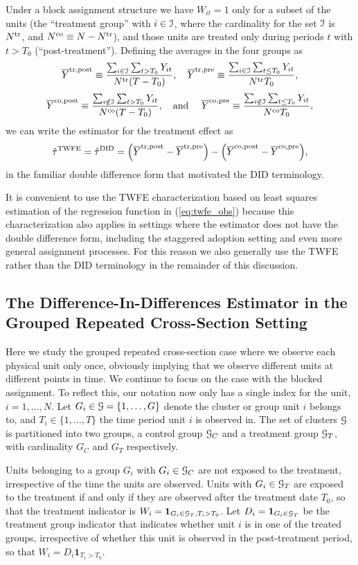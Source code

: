 \documentclass[letterpaper,12pt,leqno]{article}
\newcommand{\twfe}{\mathrm{TWFE}}
\newcommand{\treat}{{\rm tr}}
\newcommand{\control}{{\rm co}}
\newcommand{\post}{{\rm post}}
\newcommand{\pre}{{\rm pre}}
\newcommand{\oy}{\overline{Y}}
\newcommand{\did}{\mathrm{DID}}
\begin{document}
Under a block assignment structure we have  $W_{it}=1$ only for a subset of the units (the ``treatment group'' with $i\in{\cal I}$, where the cardinality for the set ${\cal I}$ is $N^\treat$, and $N^\control\equiv N-N^\treat$), and  those units are treated  only during periods $t$ with $t>T_0$ (``post-treatment'').
Defining the averages in the four groups as
\[ \oy^{\treat,\post}\equiv \frac{\sum_{i\in{\cal I}}\sum_{t>T_0} Y_{it}}{N^\treat (T-T_0)},
\quad  \oy^{\treat,\pre}\equiv \frac{\sum_{i\in{\cal I}}\sum_{t\leq T_0} Y_{it}}{N^\treat T_0},
\]
\[ \oy^{\control,\post}\equiv \frac{\sum_{i\notin{\cal I}}\sum_{t>T_0} Y_{it}}{N^\control (T-T_0)},
\quad\textrm{and } \quad \oy^{\control,\pre}\equiv \frac{\sum_{i\notin{\cal I}}\sum_{t\leq T_0} Y_{it}}{N^\control T_0},
\]
 we can write the estimator for the treatment effect as
\[ \hat\tau^\twfe= \hat\tau^\did=\Bigl(\oy^{\treat,\post}- \oy^{\treat,\pre}\Bigr)-\Bigl(\oy^{\control,\post}-\oy^{\control,\pre}\Bigr),\]
in the familiar double difference form that motivated the DID terminology.

It is convenient to use the TWFE characterization based on least squares estimation of the regression function in (\ref{eq:twfe_obs}) because this characterization also applies in settings where the estimator does not have the double difference form, including the staggered adoption setting and even more general assignment processes. For this reason we also generally use the TWFE rather than the DID terminology in the remainder of this discussion.


\subsection{The Difference-In-Differences Estimator in the Grouped Repeated Cross-Section Setting}


Here we study the grouped repeated cross-section case where we observe each physical unit only once, obviously implying that we observe different units at different points in time. We continue to focus on the case with  the blocked assignment. To reflect this, our notation now only has a single index for the unit, $i=1,\ldots, N$. Let $G_i\in{\cal G}=\{1,\ldots,G\}$ denote the cluster or group unit $i$ belongs to, and $T_i\in\{1,\ldots,T\}$ the time period unit $i$ is observed in. The set of clusters ${\cal G}$ is partitioned into two groups, a control group ${\cal G}_C$ and a treatment group ${\cal G}_T$, with cardinality $G_C$ and $G_T$ respectively.

Units belonging to a group $G_i$ with $G_i \in{\cal  G}_C$  are not exposed to the treatment, irrespective of the time the units are observed. Units with $G_i \in{\cal G}_{T}$ are exposed to the treatment if and only if they are observed after the treatment date $T_0$, so that the treatment indicator is $W_{i}=\mathbf{1}_{G_i\in{\cal G}_T,T_i>T_0}$. Let $D_i=\mathbf{1}_{G_i\in{\cal G}_T}$ be the treatment group indicator that indicates whether unit $i$ is in one of the treated groups, irrespective of whether this unit is observed in the post-treatment period, so that $W_i=D_i\mathbf{1}_{T_i>T_0}$.
 
\end{document}
